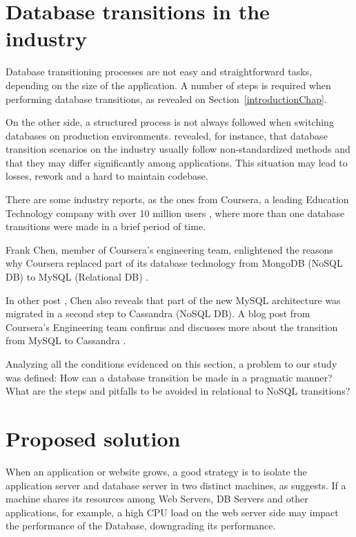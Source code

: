 \section{Database transitions in the industry}

Database transitioning processes are not easy and straightforward tasks, depending on the size of the application. A number of steps is required when performing database transitions, as revealed on Section~\ref{introductionChap}.

On the other side, a structured process is not always followed when switching databases on production environments. \cite{fabioMartinSM} revealed, for instance, that database transition scenarios on the industry usually follow non-standardized methods and that they may differ significantly among applications. This situation may lead to losses, rework and a hard to maintain codebase.

There are some industry reports, as the ones from Coursera, a leading Education Technology company with over 10 million users \cite{courserawiki}, where more than one database transitions were made in a brief period of time.  

Frank Chen, member of Coursera's engineering team, enlightened the reasons why Coursera replaced part of its database technology from MongoDB (NoSQL DB) to MySQL (Relational DB) \cite{coursera-mongodb-mysql} . 

In other post \cite{coursera-mongodb-mysql2}, Chen also reveals that part of the new MySQL architecture was migrated in a second step to Cassandra (NoSQL DB). A blog post from Coursera's Engineering team confirms and discusses more about the transition from MySQL to Cassandra \cite{coursera-mysql-cassandra}. 

Analyzing all the conditions evidenced on this section, a problem to our study was defined: How can a database transition be made in a pragmatic manner? What are the steps and pitfalls to be avoided in relational to NoSQL transitions? 

\section{Proposed solution}
\label{theSolution}

When an application or website grows, a good strategy is to isolate the application server and database server in two distinct machines, as \cite{dorm} suggests. If a machine shares its resources among Web Servers, DB Servers and other applications, for example, a high CPU load on the web server side may impact the performance of the Database, downgrading its performance. 


